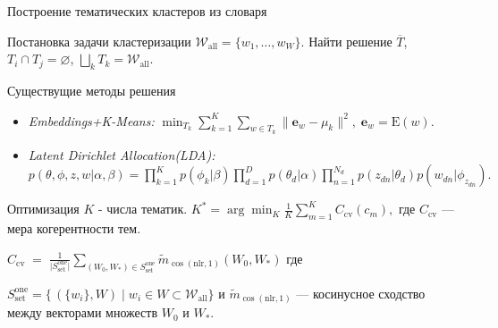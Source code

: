 \documentclass{beamer}
\begin{document}
\begin{frame}[t]{Построение тематических кластеров из словаря}
\small
\vspace{-0.3cm}
\begin{block}{Постановка задачи кластеризации}
\footnotesize
\(\mathcal{W}_{\mathrm{all}}=\{w_1,\dots,w_W\}\).  
Найти решение \(\overline{T}\), \(T_i\cap T_j=\varnothing\),
\(\bigsqcup_kT_k=\mathcal{W}_{\mathrm{all}}\).
\normalsize
\end{block}

\begin{block}{Существущие методы решения}
\vspace{-0.2cm}
\begin{itemize}
    \footnotesize
  \item \emph{Embeddings+K-Means:}
    \(\displaystyle\min_{T_k}\sum_{k=1}^K\sum_{w\in T_k}\|\mathbf e_w-\mu_k\|^2,\;\mathbf e_w=\mathrm E(w).\)
  \item \emph{Latent Dirichlet Allocation(LDA):} 
    $\displaystyle p(\theta,\phi,z,w|\alpha,\beta)
            =\prod_{k=1}^K p(\phi_k|\beta)\prod_{d=1}^D p(\theta_d|\alpha)
             \prod_{n=1}^{N_d}p(z_{dn}|\theta_d)p(w_{dn}|\phi_{z_{dn}}).$
    \normalsize        
\end{itemize}
\end{block}

\vspace{-0.7cm}
\begin{block}{Оптимизация \(K\) - числа тематик.}
\footnotesize
\(\displaystyle K^*=\arg\min_K\frac1K\sum_{m=1}^KC_{\mathrm{cv}}(c_m),\)  
где \(C_{\mathrm{cv}}\) — мера когерентности тем.

\(
  C_{\mathrm{cv}}
  \;=\;
  \frac{1}{\lvert S^{\mathrm{one}}_{\mathrm{set}}\rvert}
  \sum_{(W_0,W_*)\in S^{\mathrm{one}}_{\mathrm{set}}}
    \tilde m_{\cos(\mathrm{nlr},1)}(W_0,W_*)
\)
\vspace{0.2cm}
где 

\(
  S^{\mathrm{one}}_{\mathrm{set}}
  =\{\,(\{w_i\},W)\mid w_i\in W\subset\mathcal W_{\mathrm{all}}\}
\) и 
\(\tilde m_{\cos(\mathrm{nlr},1)}\) — косинусное сходство между векторами множеств \(W_0\) и \(W_*\).
\normalsize
\end{block}

\end{frame}
\end{document}
